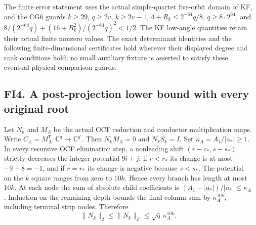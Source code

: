 \documentclass[11pt]{article}
\begin{document}
The finite error statement uses the actual simple-quartet five-orbit domain of KF, and the CG6 guards \(k\ge29\), \(q\ge2v\), \(k\ge2v-1\), \(4+R_k\le2^{-64}q/8\), \(q\ge8\cdot2^{64}\), and \(8/(2^{-64}q)+(16+R_k^2)/(2^{-64}q)^2<1/2\). The KF low-angle quantities retain their actual finite nonzero values. The exact determinant identities and the following finite-dimensional certificates hold wherever their displayed degree and rank conditions hold; no small auxiliary fixture is asserted to satisfy these eventual physical comparison guards.

\subsection{FI4. A post-projection lower bound with every original root}\label{fi4.-a-post-projection-lower-bound-with-every-original-root}

Let \(N_k\) and \(M_A\) be the actual OCF reduction and conductor multiplication maps. Write \(C_A=M_A^{\mathsf T}:\mathbb C^q\to\mathbb C^{q'}\). Then \(N_kM_A=0\) and \(N_kS_k=I\). Set \(\kappa_A=A_1/|a_*|\ge1\). In every recursive OCF elimination step, a nonleading shift \((r-r_*,s-s_*)\) strictly decreases the integer potential \(9i+j\): if \(r<r_*\) its change is at most \(-9+8=-1\), and if \(r=r_*\) its change is negative because \(s<s_*\). The potential on the \(k\) square ranges from zero to \(10k\). Hence every branch has length at most \(10k\). At each node the sum of absolute child coefficients is \((A_1-|a_*|)/|a_*|\le\kappa_A\). Induction on the remaining depth bounds the final column sum by \(\kappa_A^{10k}\), including terminal strip nodes. Therefore \[
 \|N_k\|_2\le\|N_k\|_F\le\sqrt q\,\kappa_A^{10k}.
 \tag{FI11}
\]
\end{document}
